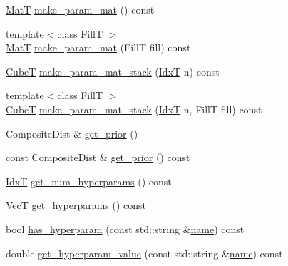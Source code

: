 \begin{DoxyCompactItemize}
\item 
\hyperlink{namespacemappel_a7091ab87c528041f7e2027195fad8915}{MatT} \hyperlink{classmappel_1_1PointEmitterModel_a8ede9fe8e3b6a3e621c2da72e23c7f9d}{make\+\_\+param\+\_\+mat} () const 
\item 
{\footnotesize template$<$class FillT $>$ }\\\hyperlink{namespacemappel_a7091ab87c528041f7e2027195fad8915}{MatT} \hyperlink{classmappel_1_1PointEmitterModel_a68a9c537f2f2725eb8fb9d3e250dd84b}{make\+\_\+param\+\_\+mat} (FillT fill) const 
\item 
\hyperlink{namespacemappel_ab2afab4e6c8805e83946670d882768c2}{CubeT} \hyperlink{classmappel_1_1PointEmitterModel_a57b98d5f8b2b5ed2c455bbf76b632f87}{make\+\_\+param\+\_\+mat\+\_\+stack} (\hyperlink{namespacemappel_ab17ec0f30b61ece292439d7ece81d3a8}{IdxT} n) const 
\item 
{\footnotesize template$<$class FillT $>$ }\\\hyperlink{namespacemappel_ab2afab4e6c8805e83946670d882768c2}{CubeT} \hyperlink{classmappel_1_1PointEmitterModel_a2c11fa045187c7ea9ba382141b5d53c1}{make\+\_\+param\+\_\+mat\+\_\+stack} (\hyperlink{namespacemappel_ab17ec0f30b61ece292439d7ece81d3a8}{IdxT} n, FillT fill) const 
\item 
Composite\+Dist \& \hyperlink{classmappel_1_1PointEmitterModel_a2182c250c15d590b582e76594e5f06b9}{get\+\_\+prior} ()
\item 
const Composite\+Dist \& \hyperlink{classmappel_1_1PointEmitterModel_a239826b8e6b914c0cdaa293f1f5ddfd4}{get\+\_\+prior} () const 
\item 
\hyperlink{namespacemappel_ab17ec0f30b61ece292439d7ece81d3a8}{IdxT} \hyperlink{classmappel_1_1PointEmitterModel_a442522cdaaa76be15b00a4f25110d7ec}{get\+\_\+num\+\_\+hyperparams} () const 
\item 
\hyperlink{namespacemappel_a2225ad69f358daa3f4f99282a35b9a3a}{VecT} \hyperlink{classmappel_1_1PointEmitterModel_a4085ade54f4b039c647bc9bf7804e007}{get\+\_\+hyperparams} () const 
\item 
bool \hyperlink{classmappel_1_1PointEmitterModel_afba2b17a81a506b0acd41616c8604412}{has\+\_\+hyperparam} (const std\+::string \&\hyperlink{classmappel_1_1Gauss2DMAP_ab108b36b4172e55b3e53cefb645199a6}{name}) const 
\item 
double \hyperlink{classmappel_1_1PointEmitterModel_a3282cc59d5c6010a51f671ba72997705}{get\+\_\+hyperparam\+\_\+value} (const std\+::string \&\hyperlink{classmappel_1_1Gauss2DMAP_ab108b36b4172e55b3e53cefb645199a6}{name}) const 

\end{DoxyCompactItemize}
